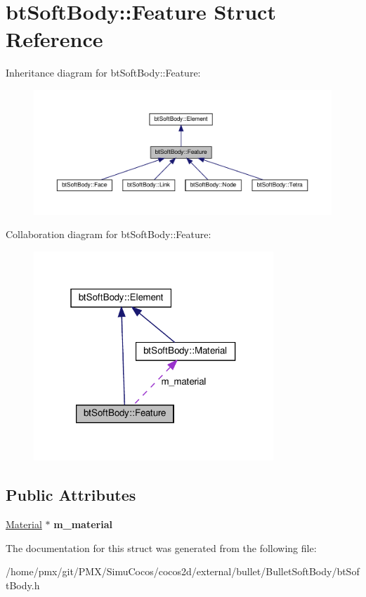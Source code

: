 \hypertarget{structbtSoftBody_1_1Feature}{}\section{bt\+Soft\+Body\+:\+:Feature Struct Reference}
\label{structbtSoftBody_1_1Feature}


Inheritance diagram for bt\+Soft\+Body\+:\+:Feature\+:
\nopagebreak
\begin{figure}[H]
\begin{center}
\leavevmode
\includegraphics[width=350pt]{structbtSoftBody_1_1Feature__inherit__graph}
\end{center}
\end{figure}


Collaboration diagram for bt\+Soft\+Body\+:\+:Feature\+:
\nopagebreak
\begin{figure}[H]
\begin{center}
\leavevmode
\includegraphics[width=256pt]{structbtSoftBody_1_1Feature__coll__graph}
\end{center}
\end{figure}
\subsection*{Public Attributes}
\begin{DoxyCompactItemize}
\item 
\mbox{\label{structbtSoftBody_1_1Feature_ae24af9323abfd07bc80ad26634c1b360}} 
\hyperlink{structbtSoftBody_1_1Material}{Material} $\ast$ {\bfseries m\+\_\+material}
\end{DoxyCompactItemize}


The documentation for this struct was generated from the following file\+:\begin{DoxyCompactItemize}
\item 
/home/pmx/git/\+P\+M\+X/\+Simu\+Cocos/cocos2d/external/bullet/\+Bullet\+Soft\+Body/bt\+Soft\+Body.\+h\end{DoxyCompactItemize}
